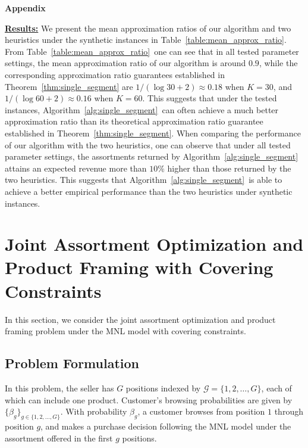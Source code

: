 \documentclass[msom,non-blindrev]{informs3} %
\theoremstyle{definition}
\begin{document}
\begin{appendices}{\Large \noindent\textbf{Appendix}}
{\underline{\textbf{Results:}} We present the mean approximation ratios of our algorithm and two heuristics under the synthetic instances in Table~\ref{table:mean_approx_ratio}. From Table~\ref{table:mean_approx_ratio}~one can see that in all tested parameter settings, the mean approximation ratio of our algorithm is around $0.9$, while the corresponding approximation ratio guarantees established in Theorem~\ref{thm:single_segment} are $1/(\log 30+2)\approx 0.18$ when $K=30$, and $1/(\log 60+2)\approx 0.16$ when $K=60$. This suggests that under the tested instances, Algorithm~\ref{alg:single_segment}~can often achieve a much better approximation ratio than its theoretical approximation ratio guarantee established in Theorem~\ref{thm:single_segment}. When comparing the performance of our algorithm with the two heuristics, one can observe that under all tested parameter settings, the assortments returned by Algorithm~\ref{alg:single_segment} attains an expected revenue more than $10\%$ higher than those returned by the two heuristics. This suggests that Algorithm~\ref{alg:single_segment}~is able to achieve a better empirical performance than the two heuristics under synthetic instances. 

}


{ 

\section{Joint Assortment Optimization and Product Framing with Covering Constraints}

In this section, we consider the joint assortment optimization and product framing problem under the MNL model with covering constraints. 

\subsection{Problem Formulation}
In this problem, the seller has $G$ positions indexed by $\mathcal{G}=\{1,2,\dots,G\}$, each of which can include one product. Customer's browsing probabilities are given by $\{\beta_g\}_{g\in\{1,2,\dots,G\}}$. With probability $\beta_g$, a customer browses from position $1$ through position $g$, and makes a purchase decision following the MNL model under the assortment offered in the first $g$ positions.

}
\end{appendices}
\end{document}
